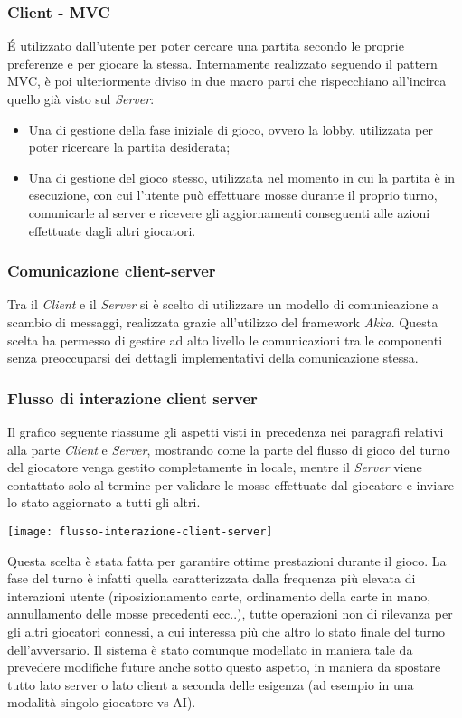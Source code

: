 \subsubsection{Client - MVC}
É utilizzato dall’utente per poter cercare una partita secondo le proprie preferenze e per giocare la stessa.
Internamente realizzato seguendo il pattern MVC, è poi ulteriormente diviso in due macro parti che rispecchiano all’incirca quello già visto sul \textit{Server}:
\begin{itemize}
    \item Una di gestione della fase iniziale di gioco, ovvero la lobby, utilizzata per poter ricercare la partita desiderata;
    \item Una di gestione del gioco stesso, utilizzata nel momento in cui la partita è in esecuzione, con cui l’utente può effettuare mosse durante il proprio turno, comunicarle al server e ricevere gli aggiornamenti conseguenti alle azioni effettuate dagli altri giocatori.
\end{itemize}
\subsubsection{Comunicazione client-server}
Tra il \textit{Client} e il \textit{Server} si è scelto di utilizzare un modello di comunicazione a scambio di messaggi, realizzata grazie all’utilizzo del framework \textit{Akka}.
Questa scelta ha permesso di gestire ad alto livello le comunicazioni tra le componenti senza preoccuparsi dei dettagli implementativi della comunicazione stessa.
\subsubsection[Flussi di interazione]{Flusso di interazione client server}
Il grafico seguente riassume gli aspetti visti in precedenza nei paragrafi relativi alla parte \textit{Client} e \textit{Server}, mostrando come la parte del flusso di gioco del turno del giocatore venga gestito completamente in locale, mentre il \textit{Server} viene contattato solo al termine per validare le mosse effettuate dal giocatore e inviare lo stato aggiornato a tutti gli altri.
\begin{center}
    \texttt{[image: flusso-interazione-client-server]}
\end{center}
Questa scelta è stata fatta per garantire ottime prestazioni durante il gioco.
La fase del turno è infatti quella caratterizzata dalla frequenza più elevata di interazioni utente (riposizionamento carte, ordinamento della carte in mano, annullamento delle mosse precedenti ecc..), tutte operazioni non di rilevanza per gli altri giocatori connessi, a cui interessa più che altro lo stato finale del turno dell’avversario.
Il sistema è stato comunque modellato in maniera tale da prevedere modifiche future anche sotto questo aspetto, in maniera da spostare tutto lato server o lato client a seconda delle esigenza (ad esempio in una modalità singolo giocatore vs AI).
\newpage